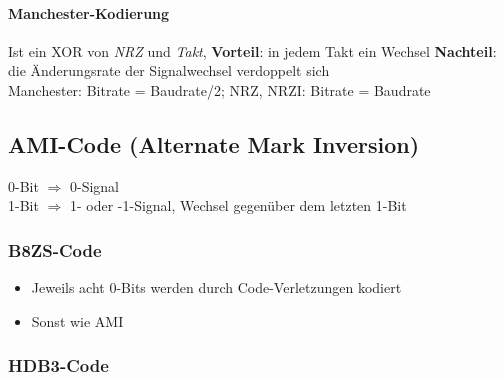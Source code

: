 \documentclass
[
	8pt,		%
	ngerman,	%
	a4paper,	%
	landscape,	%
	final		%
]{extarticle}
\begin{document}
\begin{multicols*}{4}
\paragraph{Manchester-Kodierung} Ist ein XOR von \textit{NRZ} und \textit{Takt},
\textbf{Vorteil}: in jedem Takt ein Wechsel
\textbf{Nachteil}: die Änderungsrate der Signalwechsel verdoppelt sich \\
Manchester: Bitrate = Baudrate/2; NRZ, NRZI: Bitrate = Baudrate
\subsection{AMI-Code (Alternate Mark Inversion)}
0-Bit \(\Rightarrow\) 0-Signal \\
1-Bit \(\Rightarrow\) 1- oder -1-Signal, Wechsel gegenüber dem letzten 1-Bit
\subsubsection{B8ZS-Code}
\begingroup
\setlength{\columnseprule}{0pt}
\setlength{\columnsep}{0.5\linewidth} 
\begin{multicols}{2}
	\begin{itemize}
		\item Jeweils acht 0-Bits werden durch Code-Verletzungen kodiert
		\item Sonst wie AMI
	\end{itemize}
	
\end{multicols}
\endgroup
\subsubsection{HDB3-Code}
\end{multicols*}
\end{document}
